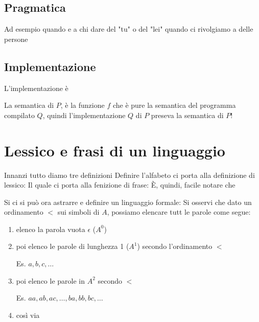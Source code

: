 \subsection{Pragmatica}
Ad esempio quando e a chi dare del "tu" o del "lei" quando ci rivolgiamo a delle persone

\subsection{Implementazione}
L'implementazione è 


La semantica di $P$, è la funzione $f$ che è pure la semantica del programma compilato $Q$, quindi l'implementazione $Q$ di $P$ preseva la semantica di $P$!

\section{Lessico e frasi di un linguaggio}
Innanzi tutto diamo tre definizioni
Definire l'alfabeto ci porta alla definizione di lessico:
Il quale ci porta alla fenizione di frase:
È, quindi, facile notare che 

Si ci si può ora astrarre e definire un linguaggio formale:
Si osservi che  dato un ordinamento $ < $ sui simboli di $A$, possiamo elencare tutt le parole come segue:
\begin{enumerate}
    \item elenco la parola vuota $\epsilon$ ($A^0$)
    \item poi elenco le parole di lunghezza 1 ($A^1$) secondo l'ordinamento $ < $
    
    Es. $a,b,c,\dots$
    \item poi elenco le parole in $A^2$ secondo $ < $
    
    Es. $aa, ab, ac, \dots, ba, bb, bc, \dots$
    \item così via
\end{enumerate}

